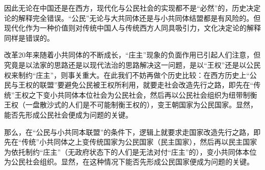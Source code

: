 \documentclass[a4paper,12pt,punct=kaiming]{ctexart}
\begin{document}
因此无论在中国还是在西方，现代化与公民社会的实现都不是“必然”的，历史决定论的解释完全错误。“公民”无论与大共同体还是与小共同体结盟都是有风险的。但现代化作为一种价值则对传统中国人与传统西方人同具吸引力，文化决定论的解释同样是错误的。

改革20年来随着小共同体的不断成长，“庄主”现象的负面作用已引起人们注意，但究竟是以法家的思路还是以现代法治的思路解决这一问题，是以“王权”还是以公民权来制约“庄主”，则事关重大。在此我们不妨再做个历史比较：在西方历史上“公民与王权的联盟”要避免公民被王权所利用，就要走社会改造先行之路，即先在“传统”王权之下变小共同体本位社会为公民社会，然后再以公民社会组织为纽带制衡王权（一盘散沙式的人们是不可能制衡王权的），变王朝国家为公民国家。显然，能否先形成公民社会便成为问题的关键。

那么，在“公民与小共同本联盟”的条件下，逻辑上就要求走国家改造先行之路，即先在“传统”小共同体之上变传统国家为公民国家（民主国家），然后再以民主国家为依托制约“庄主”（无政府状态下的人们是无法对付“庄主”的），变小共同体本位为公民社会组织。显然，在这种情况下能否先形成公民国家便成为问题的关键。
\end{document}
